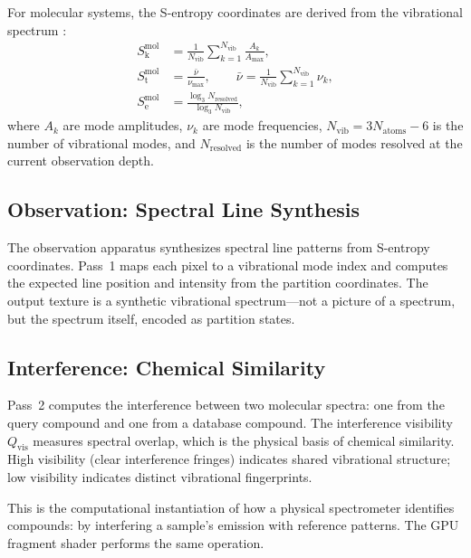 \documentclass[11pt,twocolumn,a4paper]{article}
\theoremstyle{definition}
\theoremstyle{remark}
\newcommand{\Sk}{S_{\mathrm{k}}}
\newcommand{\St}{S_{\mathrm{t}}}
\newcommand{\Se}{S_{\mathrm{e}}}
\newcommand{\Qvis}{Q_{\mathrm{vis}}}
\begin{document}
For molecular systems, the S-entropy coordinates are derived from the vibrational spectrum \citep{sachikonye2025b}:
\begin{align}
\Sk^{\mathrm{mol}} &= \frac{1}{N_{\mathrm{vib}}} \sum_{k=1}^{N_{\mathrm{vib}}} \frac{A_k}{A_{\max}}, \label{eq:sk_mol} \\
\St^{\mathrm{mol}} &= \frac{\bar{\nu}}{\nu_{\max}}, \qquad \bar{\nu} = \frac{1}{N_{\mathrm{vib}}} \sum_{k=1}^{N_{\mathrm{vib}}} \nu_k, \label{eq:st_mol} \\
\Se^{\mathrm{mol}} &= \frac{\log_3 N_{\mathrm{resolved}}}{\log_3 N_{\mathrm{vib}}}, \label{eq:se_mol}
\end{align}
where $A_k$ are mode amplitudes, $\nu_k$ are mode frequencies, $N_{\mathrm{vib}} = 3N_{\mathrm{atoms}} - 6$ is the number of vibrational modes, and $N_{\mathrm{resolved}}$ is the number of modes resolved at the current observation depth.

\subsection{Observation: Spectral Line Synthesis}

The observation apparatus synthesizes spectral line patterns from S-entropy coordinates. Pass~1 maps each pixel to a vibrational mode index and computes the expected line position and intensity from the partition coordinates. The output texture is a synthetic vibrational spectrum---not a picture of a spectrum, but the spectrum itself, encoded as partition states.

\subsection{Interference: Chemical Similarity}

Pass~2 computes the interference between two molecular spectra: one from the query compound and one from a database compound. The interference visibility $\Qvis$ measures spectral overlap, which is the physical basis of chemical similarity. High visibility (clear interference fringes) indicates shared vibrational structure; low visibility indicates distinct vibrational fingerprints.

This is the computational instantiation of how a physical spectrometer identifies compounds: by interfering a sample's emission with reference patterns. The GPU fragment shader performs the same operation.


\end{document}
